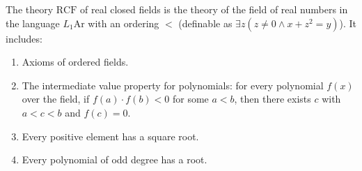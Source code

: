 The theory $\mathrm{RCF}$ of real closed fields is the theory of the field of real numbers in the language $L_1\mathrm{Ar}$ with an ordering $<$ (definable as $\exists z (z \neq 0 \land x + z^2 = y)$). It includes:
\begin{enumerate}
\item Axioms of ordered fields.
\item The intermediate value property for polynomials: for every polynomial $f(x)$ over the field, if $f(a) \cdot f(b) < 0$ for some $a < b$, then there exists $c$ with $a < c < b$ and $f(c) = 0$.
\item Every positive element has a square root.
\item Every polynomial of odd degree has a root.
\end{enumerate}
